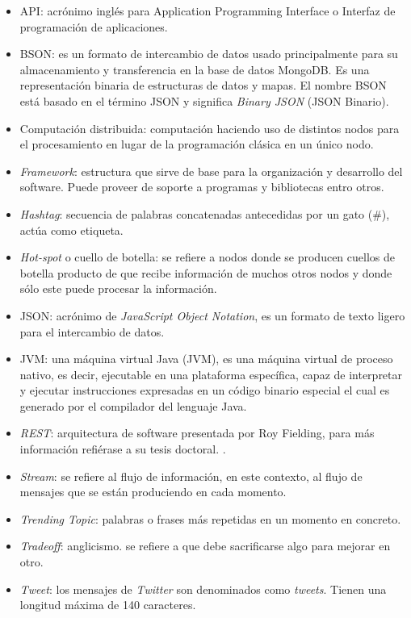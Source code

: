 \begin{glosario}

\begin{itemize}
\item API: acrónimo inglés para Application Programming Interface o Interfaz de programación de aplicaciones.
\item BSON: es un formato de intercambio de datos usado principalmente para su almacenamiento y transferencia en la base de datos MongoDB. Es una representación binaria de estructuras de datos y mapas. El nombre BSON está basado en el término JSON y significa \textit{Binary JSON} (JSON Binario).
\item Computación distribuida: computación haciendo uso de distintos nodos para el procesamiento en lugar de la programación clásica en un único nodo.
\item \textit{Framework}: estructura que sirve de base para la organización y desarrollo del software. Puede proveer de soporte a programas y bibliotecas entro otros.
\item \textit{Hashtag}: secuencia de palabras concatenadas antecedidas por un gato (\#), actúa como etiqueta.
\item \textit{Hot-spot} o cuello de botella: se refiere a nodos donde se producen cuellos de botella producto de que recibe información de muchos otros nodos y donde sólo este puede procesar la información.
\item JSON: acrónimo de \textit{JavaScript Object Notation}, es un formato de texto ligero para el intercambio de datos.
\item JVM: una máquina virtual Java (JVM), es una máquina virtual de proceso nativo, es decir, ejecutable en una plataforma específica, capaz de interpretar y ejecutar instrucciones expresadas en un código binario especial el cual es generado por el compilador del lenguaje Java.
\item \textit{REST}: arquitectura de software presentada por Roy Fielding, para más información refiérase a su tesis doctoral. \cite{Fielding}.
\item \textit{Stream}: se refiere al flujo de información, en este contexto, al flujo de mensajes que se están produciendo en cada momento.
\item \textit{Trending Topic}: palabras o frases más repetidas en un momento en concreto.
\item \textit{Tradeoff}: anglicismo. se refiere a que debe sacrificarse algo para mejorar en otro.
\item \textit{Tweet}: los mensajes de \textit{Twitter} son denominados como \textit{tweets}. Tienen una longitud máxima de 140 caracteres. 

\end{itemize}
\end{glosario}
